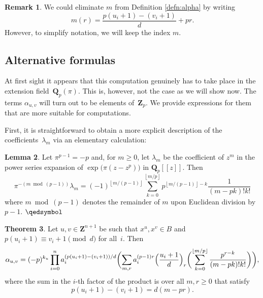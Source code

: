 \documentclass[a4paper,11pt]{article}
\numberwithin{equation}{section}
\providecommand{\floor}[1]{\left\lfloor#1\right\rfloor}   %
\newcommand{\ZZ}{\mathbf{Z}} %
\newcommand{\QQ}{\mathbf{Q}} %
\theoremstyle{definition}
\newtheorem{thm}{Theorem}[section]
\newtheorem{lem}[thm]{Lemma}
\newtheorem{rem}[thm]{Remark}
\begin{document}
\begin{rem}
We could eliminate $m$ from Definition \ref{defn:alpha} by writing 
\[
m(r)=\frac{p(u_i+1) - (v_i+1)}{d}+pr.
\]
However, to simplify notation, we will keep the index $m$.
\end{rem}

\subsection{Alternative formulas}

At first sight it appears that this computation genuinely has to 
take place in the extension field~$\QQ_p(\pi)$.  This is, however, 
not the case as we will show now.  The terms $\alpha_{u,v}$ 
will turn out to be elements of~$\ZZ_p$. We provide expressions 
for them that are more suitable for computations.

First, it is straightforward to obtain a more explicit description 
of the coefficients~$\lambda_m$ via an elementary calculation:

\begin{lem} \label{lem:lambdam}
Let $\pi^{p-1} = -p$ and, for $m \geq 0$, let $\lambda_m$ 
be the coefficient of $z^m$ in the power series expansion 
of $\exp \bigl( \pi (z - z^p) \bigr)$ in $\QQ_p[[z]]$.  Then 
\begin{equation*}
\pi^{- (m \bmod{(p-1)})} \lambda_m = (-1)^{\floor{m/(p-1)}} \sum_{k=0}^{\floor{m/p}} p^{\floor{m/(p-1)} - k} \frac{1}{(m-pk)! k!}
\end{equation*}
where $m \bmod{(p-1)}$ denotes the remainder of $m$ upon Euclidean 
division by $p-1$. \hfill $\qedsymbol$
\end{lem}

\begin{thm} \label{thm:alpha}
Let $u, v \in \ZZ^{n+1}$ be such that 
$x^u, x^v \in B$ and 
$p (u_i + 1) \equiv v_i + 1 \pmod{d}$ for all~$i$. 
Then 
\begin{equation*}
\alpha_{u,v}=(-p)^{k_u} \prod_{i=0}^n a_i^{(p (u_i + 1) - (v_i + 1))/d} \biggl( \sum_{m,r} a_i^{(p-1)r}\Bigl( \frac{u_i+1}{d} \Bigr)_r \biggl( \sum_{k=0}^{\floor{m/p}} \frac{p^{r-k}}{(m-pk)!k!}  \biggr) \biggr),
\end{equation*}
where the sum in the $i$-th factor of the product is over all $m, r \geq 0$  
that satisfy
\[
p(u_i+1)-(v_i+1)=d(m-pr).
\]
\end{thm}
\end{document}
